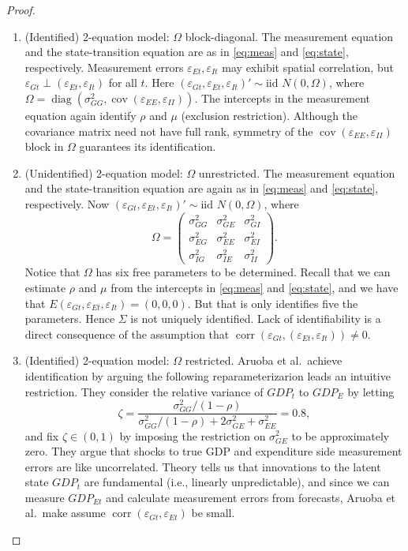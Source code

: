 \documentclass[oneside,reqno]{amsart}
\DeclareMathOperator{\cov}{cov}
\DeclareMathOperator{\corr}{corr}
\DeclareMathOperator{\diag}{diag}
\newcommand{\eps}{\varepsilon}
\theoremstyle{definition}
\begin{document}
\begin{enumerate}[label=(\roman*)]
\begin{proof}
\begin{enumerate}[label=(\arabic*)]
\item
(Identified) 2-equation model: $\Omega$ block-diagonal. The measurement equation and the state-transition equation are as in \eqref{eq:meas} and \eqref{eq:state}, respectively. Measurement errors $\eps_{Et}, \eps_{It}$ may exhibit spatial correlation, but $\eps_{Gt} \perp (\eps_{Et}, \eps_{It})$ for all $t$. Here $(\eps_{Gt}, \eps_{Et}, \eps_{It})' \sim \text{iid } N(0, \Omega)$, where $\Omega = \diag(\sigma_{GG}^2, \cov(\eps_{EE}, \eps_{II}))$. The intercepts in the measurement equation again identify $\rho$ and $\mu$ (exclusion restriction). Although the covariance matrix need not have full rank, symmetry of the $\cov(\eps_{EE}, \eps_{II})$ block in $\Omega$ guarantees its identification.
\item
(Unidentified) 2-equation model: $\Omega$ unrestricted. The measurement equation and the state-transition equation are again as in \eqref{eq:meas} and \eqref{eq:state}, respectively. Now $(\eps_{Gt}, \eps_{Et}, \eps_{It})' \sim \text{iid } N(0, \Omega)$, where
\begin{equation}\label{eq:unres-sigma}
	\Omega = \begin{pmatrix}
		\sigma_{GG}^2 & \sigma_{GE}^2 & \sigma_{GI}^2 \\
		\sigma_{EG}^2 & \sigma_{EE}^2 & \sigma_{EI}^2 \\
		\sigma_{IG}^2 & \sigma_{IE}^2 &  \sigma_{II}^2
	\end{pmatrix}.
\end{equation}
Notice that $\Omega$ has six free parameters to be determined. Recall that we can estimate $\rho$ and $\mu$ from the intercepts in \eqref{eq:meas} and \eqref{eq:state}, and we have that $E(\eps_{Gt}, \eps_{Et}, \eps_{It}) = (0, 0, 0)$. But that is only identifies five the parameters. Hence $\Sigma$ is not uniquely identified. Lack of identifiability is a direct consequence of the assumption that $\corr(\eps_{Gt}, (\eps_{Et}, \eps_{It})) \neq 0$.
\item
(Identified) 2-equation model: $\Omega$ restricted. Aruoba et al.\ achieve identification by arguing the following reparameterizarion leads an intuitive restriction. They consider the relative variance of $GDP_t$ to $GDP_E$ by letting
\[
	\zeta = \frac{\sigma_{GG}^2/(1-\rho)}{\sigma_{GG}^2/(1-\rho) + 2 \sigma_{GE}^2 + \sigma_{EE}^2} = 0.8,
\]
and fix $\zeta \in (0,1)$ by imposing the restriction on $\sigma_{GE}^2$ to be approximately zero. They argue that  shocks to true GDP and expenditure side measurement errors are like uncorrelated. Theory tells us that innovations to the latent state $GDP_t$ are fundamental (i.e., linearly unpredictable), and since we can measure $GDP_{Et}$ and calculate measurement errors from forecasts, Aruoba et al.\ make assume $\corr(\eps_{ Gt}, \eps_{Et})$ be small. 

\end{enumerate}
\end{proof}
\end{enumerate}
\end{document}
